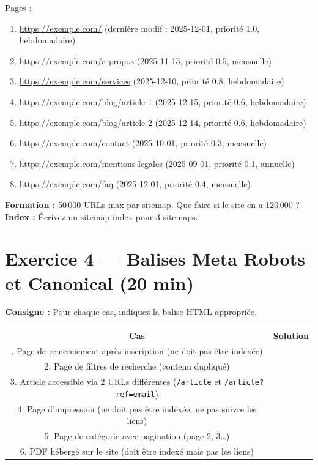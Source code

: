 \documentclass[12pt,a4paper]{report}
\begin{document}
Pages :
\begin{enumerate}
    \item \url{https://exemple.com/} (derni\`{e}re modif : 2025-12-01, priorit\'{e} 1.0, hebdomadaire)
    \item \url{https://exemple.com/a-propos} (2025-11-15, priorit\'{e} 0.5, mensuelle)
    \item \url{https://exemple.com/services} (2025-12-10, priorit\'{e} 0.8, hebdomadaire)
    \item \url{https://exemple.com/blog/article-1} (2025-12-15, priorit\'{e} 0.6, hebdomadaire)
    \item \url{https://exemple.com/blog/article-2} (2025-12-14, priorit\'{e} 0.6, hebdomadaire)
    \item \url{https://exemple.com/contact} (2025-10-01, priorit\'{e} 0.3, mensuelle)
    \item \url{https://exemple.com/mentions-legales} (2025-09-01, priorit\'{e} 0.1, annuelle)
    \item \url{https://exemple.com/faq} (2025-12-01, priorit\'{e} 0.4, mensuelle)
\end{enumerate}

\textbf{Formation :} 50\,000 URLs max par sitemap. Que faire si le site en a 120\,000 ?\\
\textbf{Index :} \'{E}crivez un sitemap index pour 3 sitemaps.

\section{Exercice 4 --- Balises Meta Robots et Canonical (20 min)}

\textbf{Consigne :} Pour chaque cas, indiquez la balise HTML appropri\'{e}e.

\begin{longtable}{cp{8cm}}
\toprule
Cas & Solution \\
\midrule
\endhead
\bottomrule
\endfoot
1. Page de remerciement apr\`{e}s inscription (ne doit pas \^{e}tre index\'{e}e) & \\
2. Page de filtres de recherche (contenu dupliqu\'{e}) & \\
3. Article accessible via 2 URLs diff\'{e}rentes (\texttt{/article} et \texttt{/article?ref=email}) & \\
4. Page d'impression (ne doit pas \^{e}tre index\'{e}e, ne pas suivre les liens) & \\
5. Page de cat\'{e}gorie avec pagination (page 2, 3\ldots) & \\
6. PDF h\'{e}berg\'{e} sur le site (doit \^{e}tre index\'{e} mais pas les liens) & \\
\bottomrule
\end{longtable}
\end{document}
